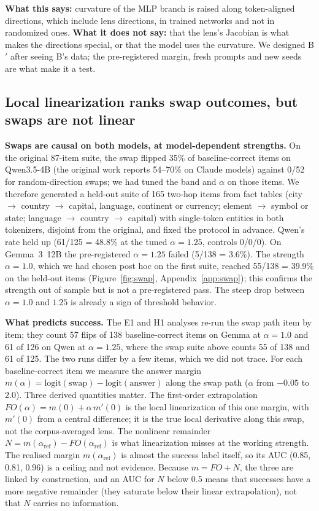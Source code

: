 \documentclass[10pt]{article}
\begin{document}
\textbf{What this says:} curvature of the MLP branch is raised along token-aligned directions, which include lens directions, in trained networks and not in randomized ones. \textbf{What it does not say:} that the lens's Jacobian is what makes the directions special, or that the model uses the curvature. We designed B$'$ after seeing B's data; the pre-registered margin, fresh prompts and new seeds are what make it a test.

\subsection{Local linearization ranks swap outcomes, but swaps are not linear}
\label{sec:suffice}
\textbf{Swaps are causal on both models, at model-dependent strengths.} On the original 87-item suite, the swap flipped 35\% of baseline-correct items on Qwen3.5-4B (the original work reports 54--70\% on Claude models) against 0/52 for random-direction swaps; we had tuned the band and $\alpha$ on those items. We therefore generated a held-out suite of 165 two-hop items from fact tables (city $\to$ country $\to$ capital, language, continent or currency; element $\to$ symbol or state; language $\to$ country $\to$ capital) with single-token entities in both tokenizers, disjoint from the original, and fixed the protocol in advance. Qwen's rate held up (61/125 = 48.8\% at the tuned $\alpha=1.25$, controls 0/0/0). On Gemma~3~12B the pre-registered $\alpha=1.25$ failed (5/138 = 3.6\%). The strength $\alpha=1.0$, which we had chosen post hoc on the first suite, reached 55/138 = 39.9\% on the held-out items (Figure~\ref{fig:swap}, Appendix~\ref{app:swap}); this confirms the strength out of sample but is not a pre-registered pass. The steep drop between $\alpha=1.0$ and $1.25$ is already a sign of threshold behavior.


\textbf{What predicts success.} The E1 and H1 analyses re-run the swap path item by item; they count 57 flips of 138 baseline-correct items on Gemma at $\alpha=1.0$ and 61 of 126 on Qwen at $\alpha=1.25$, where the swap suite above counts 55 of 138 and 61 of 125. The two runs differ by a few items, which we did not trace. For each baseline-correct item we measure the answer margin $m(\alpha)=\mathrm{logit}(\text{swap})-\mathrm{logit}(\text{answer})$ along the swap path ($\alpha$ from $-0.05$ to $2.0$). Three derived quantities matter. The first-order extrapolation $FO(\alpha)=m(0)+\alpha\,m'(0)$ is the local linearization of this one margin, with $m'(0)$ from a central difference; it is the true local derivative along this swap, not the corpus-averaged lens. The nonlinear remainder $N=m(\alpha_{\mathrm{ref}})-FO(\alpha_{\mathrm{ref}})$ is what linearization misses at the working strength. The realised margin $m(\alpha_{\mathrm{ref}})$ is almost the success label itself, so its AUC (0.85, 0.81, 0.96) is a ceiling and not evidence. Because $m=FO+N$, the three are linked by construction, and an AUC for $N$ below 0.5 means that successes have a more negative remainder (they saturate below their linear extrapolation), not that $N$ carries no information.
\end{document}
